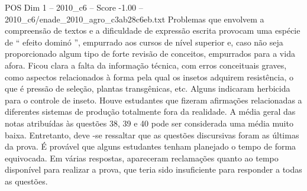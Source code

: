 \begin{textsample}{POS Dim 1 – 2010\_c6 – Score -1.00 – 2010\_c6/enade\_2010\_agro\_c3ab28c6eb.txt}
Problemas que envolvem a compreensão de textos e a dificuldade de expressão escrita provocam uma espécie de “ efeito dominó ”, empurrado aos cursos de nível superior e, caso não seja proporcionado algum tipo de forte revisão de conceitos, empurrados para a vida afora.
Ficou clara a falta da informação técnica, com erros conceituais graves, como aspectos relacionados à forma pela qual os insetos adquirem resistência, o que é pressão de seleção, plantas transgênicas, etc.
Alguns indicaram herbicida para o controle de inseto.
Houve estudantes que fizeram afirmações relacionadas a diferentes sistemas de produção totalmente fora da realidade.
A média geral das notas atribuídas às questões 38, 39 e 40 pode ser considerada uma média muito baixa.
Entretanto, deve -se ressaltar que as questões discursivas foram as últimas da prova.
É provável que alguns estudantes tenham planejado o tempo de forma equivocada.
Em várias respostas, apareceram reclamações quanto ao tempo disponível para realizar a prova, que teria sido insuficiente para responder a todas as questões.

\end{textsample}
